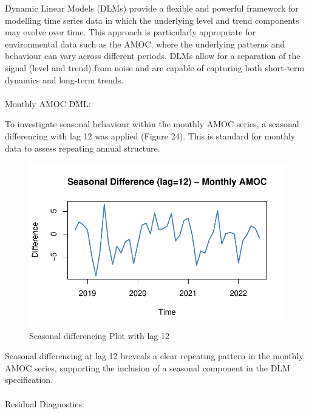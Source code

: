 \documentclass[
  11pt,
]{article}
\makeatletter
\let\oldparagraph\paragraph
\renewcommand{\paragraph}{
    \@ifstar
      \xxxParagraphStar
      \xxxParagraphNoStar
  }
\newcommand{\xxxParagraphStar}[1]{\oldparagraph*{#1}\mbox{}}
\newcommand{\xxxParagraphNoStar}[1]{\oldparagraph{#1}\mbox{}}
\makeatother
\begin{document}
Dynamic Linear Models (DLMs) provide a flexible and powerful framework
for modelling time series data in which the underlying level and trend
components may evolve over time. This approach is particularly
appropriate for environmental data such as the AMOC, where the
underlying patterns and behaviour can vary across different periods.
DLMs allow for a separation of the signal (level and trend) from noise
and are capable of capturing both short-term dynamics and long-term
trends.

\paragraph{Monthly AMOC DML:}\label{monthly-amoc-dml}

To investigate seasonal behaviour within the monthly AMOC series, a
seasonal differencing with lag 12 was applied (Figure 24). This is
standard for monthly data to assess repeating annual structure.

\begin{figure}[H]

{\centering \includegraphics{project_files/figure-pdf/fig-monthlydml-1.pdf}

}

\caption{Seasonal differencing Plot with lag 12}

\end{figure}%

Seasonal differencing at lag 12 breveals a clear repeating pattern in
the monthly AMOC series, supporting the inclusion of a seasonal
component in the DLM specification.

\paragraph{Residual Diagnostics:}\label{residual-diagnostics}
\end{document}
